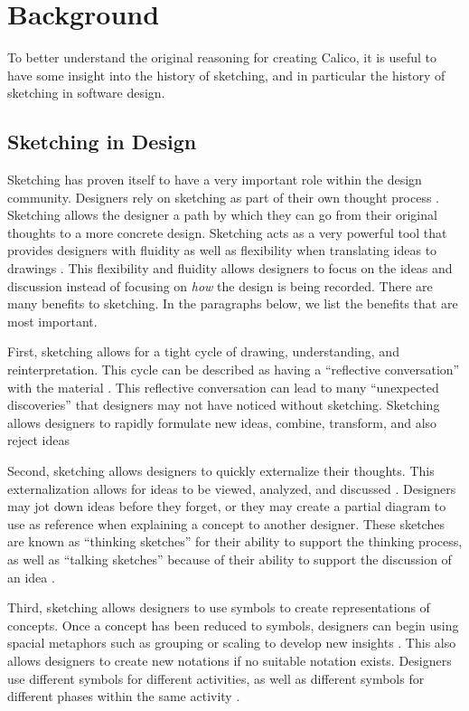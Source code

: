 \chapter{Background}

To better understand the original reasoning for creating Calico, it is useful to have some insight into the history of sketching, and in particular the history of sketching in software design. 

\section{Sketching in Design}

Sketching has proven itself to have a very important role within the design community. 
Designers rely on sketching as part of their own thought process \cite{petre}. Sketching allows the designer a path by which they can go from their original thoughts to a more concrete design. Sketching acts as a very powerful tool that provides designers with fluidity as well as flexibility when translating ideas to drawings \cite{csik}. This flexibility and fluidity allows designers to focus on the ideas and discussion instead of focusing on \emph{how} the design is being recorded. There are many benefits to sketching. In the paragraphs below, we list the benefits that are most important.

First, sketching allows for a tight cycle of drawing, understanding, and reinterpretation. This cycle can be described as having a ``reflective conversation'' with the material \cite{schon}. This reflective conversation can lead to many ``unexpected discoveries'' \cite{suwa} that designers may not have noticed without sketching. Sketching allows designers to rapidly formulate new ideas, combine, transform, and also reject ideas

Second, sketching allows designers to quickly externalize their thoughts. This externalization allows for ideas to be viewed, analyzed, and discussed \cite{petre}. Designers may jot down ideas before they forget, or they may create a partial diagram to use as reference when explaining a concept to another designer. These sketches are known as ``thinking sketches'' for their ability to support the thinking process, as well as ``talking sketches'' because of their ability to support the discussion of an idea \cite{ferguson}. 

Third, sketching allows designers to use symbols to create representations of concepts. Once a concept has been reduced to symbols, designers can begin using spacial metaphors such as grouping or scaling to develop new insights \cite{larkin}. This also allows designers to create new notations if no suitable notation exists. Designers use different symbols for different activities, as well as different symbols for different phases within the same activity \cite{goel}. 

